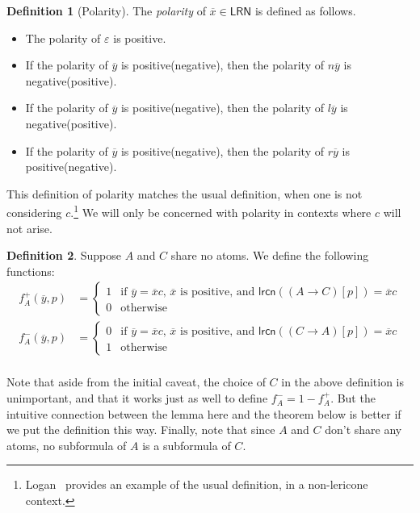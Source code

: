 \documentclass{amsart}
\theoremstyle{definition}
\newtheorem{mdef}{Definition}
\newcommand{\LRN}{\mathsf{LRN}}
\newcommand{\lrcn}{\mathsf{lrcn}}
\begin{document}
\begin{mdef}[Polarity]
    The \emph{polarity} of $\overline{x}\in\LRN$ is defined as follows. 
    \begin{itemize}
        \item The polarity of $\varepsilon$ is positive. 
        \item If the polarity of $\overline{y}$ is positive(negative), then the polarity of $n\overline{y}$ is negative(positive). 
        \item If the polarity of $\overline{y}$ is positive(negative), then the polarity of $l\overline{y}$ is negative(positive). 
        \item If the polarity of $\overline{y}$ is positive(negative), 
then the polarity of $r\overline{y}$ is positive(negative). 
    \end{itemize}
\end{mdef}

This definition of polarity matches the usual definition, when one is not considering $c$.\footnote{Logan~\citeyearpar{logan2022} provides an example of the usual definition, in a non-lericone context.}
We will only be concerned with polarity in contexts where $c$ will not arise.


\begin{mdef}
    Suppose $A$ and $C$ share no atoms. We define the following functions:
    \begin{align*}
    f^+_{A}(\overline{y},p) & =\left\{
        \begin{array}{rl} 
            1 & \text{if $\overline{y}=\overline{x}c$, $\overline{x}$ is positive, and $\lrcn((A\to C)[p])=\overline{x}c$} \\
            0 & \text{otherwise}
        \end{array}\right. \\
        f^-_{A}(\overline{y},p)& =\left\{
        \begin{array}{rl} 
            0 & \text{if $\overline{y}=\overline{x}c$, $\overline{x}$ is positive, and $\lrcn((C\to A)[p])=\overline{x}c$} \\
            1 & \text{otherwise}
        \end{array}\right. \\
    \end{align*}
\end{mdef}

Note that aside from the initial caveat, the choice of $C$ in the above definition is unimportant, and that it works just as well to define $f^-_{A}=1-f^+_{A}$. But the intuitive connection between the lemma here and the theorem below is better if we put the definition this way. Finally, note that since $A$ and $C$ don't share any atoms, no subformula of $A$ is a subformula of $C$.
\end{document}
